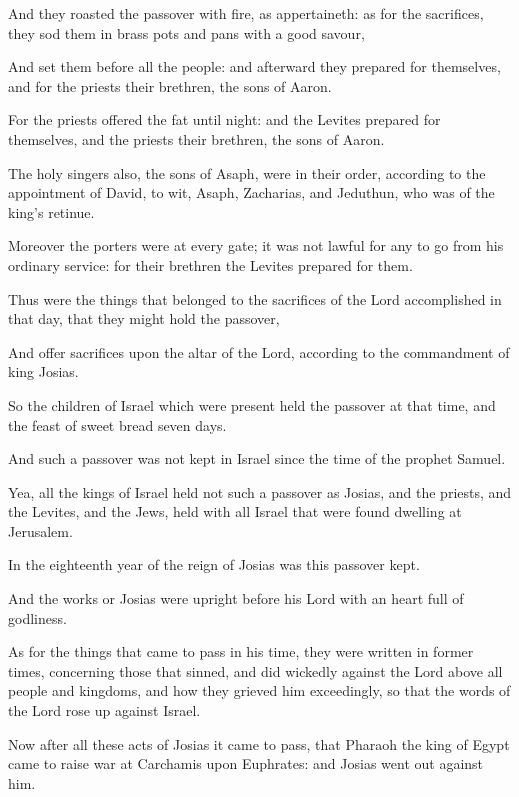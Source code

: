 {\par }{\PP {}And they roasted the passover with fire, as appertaineth: as for the sacrifices, they sod them in brass pots and pans with a good savour,
\par }{\PP {}And set them before all the people: and afterward they prepared for themselves, and for the priests their brethren, the sons of Aaron.
\par }{\PP {}For the priests offered the fat until night: and the Levites prepared for themselves, and the priests their brethren, the sons of Aaron.
\par }{\PP {}The holy singers also, the sons of Asaph, were in their order, according to the appointment of David, to wit, Asaph, Zacharias, and Jeduthun, who was of the king’s retinue.
\par }{\PP {}Moreover the porters were at every gate; it was not lawful for any to go from his ordinary service: for their brethren the Levites prepared for them.
\par }{\PP {}Thus were the things that belonged to the sacrifices of the Lord accomplished in that day, that they might hold the passover,
\par }{\PP {}And offer sacrifices upon the altar of the Lord, according to the commandment of king Josias.
\par }{\PP {}So the children of Israel which were present held the passover at that time, and the feast of sweet bread seven days.
\par }{\PP {}And such a passover was not kept in Israel since the time of the prophet Samuel.
\par }{\PP {}Yea, all the kings of Israel held not such a passover as Josias, and the priests, and the Levites, and the Jews, held with all Israel that were found dwelling at Jerusalem.
\par }{\PP {}In the eighteenth year of the reign of Josias was this passover kept.
\par }{\PP {}And the works or Josias were upright before his Lord with an heart full of godliness.
\par }{\PP {}As for the things that came to pass in his time, they were written in former times, concerning those that sinned, and did wickedly against the Lord above all people and kingdoms, and how they grieved him exceedingly, so that the words of the Lord rose up against Israel.
\par }{\PP {}Now after all these acts of Josias it came to pass, that Pharaoh the king of Egypt came to raise war at Carchamis upon Euphrates: and Josias went out against him.
}
